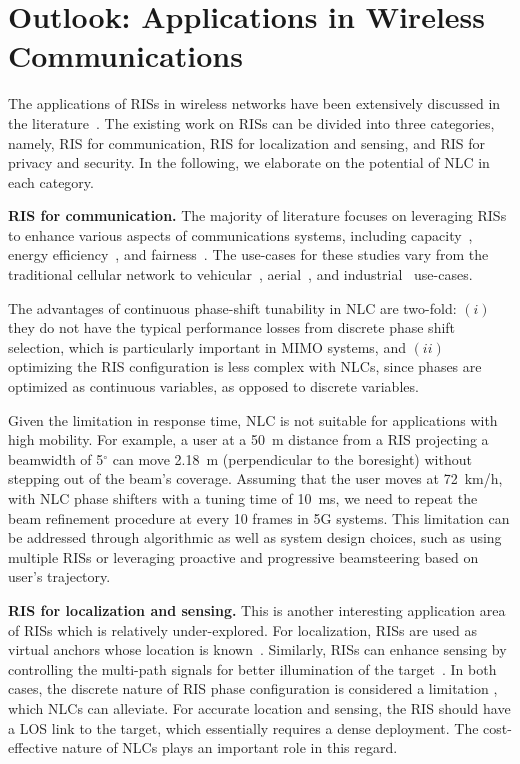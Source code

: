 \section{Outlook: Applications in Wireless Communications}
\label{sc:applications}
The applications of \glspl{RIS} in wireless networks have been extensively discussed in the literature~\cite{liu2021reconfigurable}. The existing work on \glspl{RIS} can be divided into three categories, namely, \gls{RIS} for communication, \gls{RIS} for localization and sensing, and \gls{RIS} for privacy and security. In the following, we elaborate on the potential of \gls{NLC} in each category. 

\textbf{RIS for communication.} The majority of literature focuses on leveraging \glspl{RIS} to enhance various aspects of communications systems, including capacity~\cite{bRISSR}, energy efficiency~\cite{bRISEE}, and fairness~\cite{bRISUF}. The use-cases for these studies vary from the traditional cellular network to vehicular~\cite{liu2020machine}, aerial~\cite{chen2022reconfigurable}, and industrial~\cite{dhok2021non} use-cases. 

The advantages of continuous phase-shift tunability in \gls{NLC} are two-fold: $(i)$ they do not have the typical performance losses from discrete phase shift selection, which is particularly important in MIMO systems, and $(ii)$ optimizing the \gls{RIS} configuration is less complex with \glspl{NLC}, since phases are optimized as continuous variables, as opposed to discrete variables. 

Given the limitation in response time, \gls{NLC} is not suitable for applications with high mobility. For example, a user at a \SI{50}{\meter} distance from a \gls{RIS} projecting a beamwidth of 5$^\circ$ can move \SI{2.18}{\meter} (perpendicular to the boresight) without stepping out of the beam's coverage. Assuming that the user moves at \SI{72}{\kilo\meter/\hour}, with \gls{NLC} phase shifters with a tuning time of \SI{10}{\milli\second}, we need to repeat the beam refinement procedure at every 10 frames in 5G systems. This limitation can be addressed through algorithmic as well as system design choices, such as using multiple \glspl{RIS} or leveraging proactive and progressive beamsteering based on user's trajectory. 

\textbf{RIS for localization and sensing.} This is another interesting application area of \glspl{RIS} which is relatively under-explored. For localization, \glspl{RIS} are used as virtual anchors whose location is known~\cite{emenonye2022fundamentals}. Similarly, \glspl{RIS} can enhance sensing by controlling the multi-path signals for better illumination of the target~\cite{hu2020reconfigurable}. In both cases, the discrete nature of \gls{RIS} phase configuration is considered a limitation \cite{keykhosravi2021multi}, which \glspl{NLC} can alleviate. For accurate location and sensing, the \gls{RIS} should have a \gls{LOS} link to the target, which essentially requires a dense deployment. The cost-effective nature of \glspl{NLC} plays an important role in this regard. 

